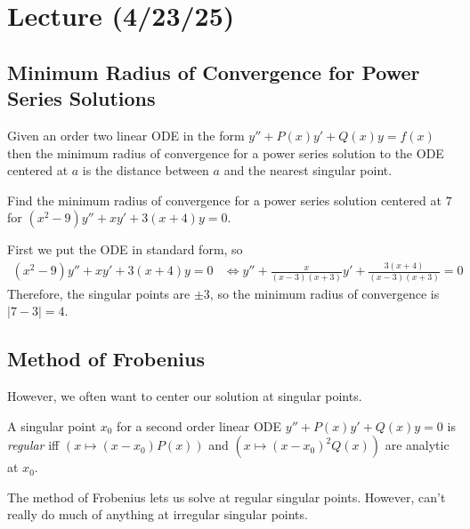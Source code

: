 \documentclass[notes]{subfiles}
\begin{document}
\setcounter{section}{22}
\section{Lecture (4/23/25)}

\subsection{Minimum Radius of Convergence for Power Series Solutions}
\begin{theorem}
    Given an order two linear ODE in the form $y'' + P(x)y' + Q(x)y = f(x)$ then the minimum radius of convergence for a power series solution to the ODE centered at $a$ is the distance between $a$ and the nearest singular point.
\end{theorem}

\begin{exercise}
    Find the minimum radius of convergence for a power series solution centered at $7$ for $(x^2 - 9)y'' + xy' + 3(x + 4)y = 0$.
\end{exercise}
\begin{solution}
    First we put the ODE in standard form, so
    \begin{align*}
        (x^2 - 9)y'' + xy' + 3(x + 4)y = 0
        &\iff y'' + \frac{x}{(x - 3)(x + 3)}y' + \frac{3(x + 4)}{(x - 3)(x + 3)} = 0
    \end{align*}
    Therefore, the singular points are $\pm 3$, so the minimum radius of convergence is $|7 - 3| = 4$.
\end{solution}

\subsection{Method of Frobenius}
However, we often want to center our solution at singular points.

\begin{definition}
    A singular point $x_0$ for a second order linear ODE $y'' + P(x)y' + Q(x)y = 0$ is \textsl{regular} iff $(x \mapsto (x - x_0)P(x))$ and $(x \mapsto (x - x_0)^2 Q(x))$ are analytic at $x_0$.
\end{definition}

The method of Frobenius lets us solve at regular singular points. However, can't really do much of anything at irregular singular points.
\end{document}

